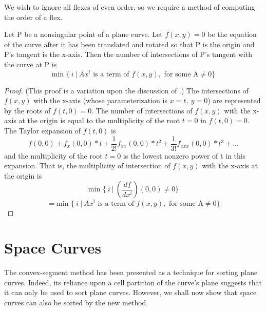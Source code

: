 We wish to ignore all flexes of even order, so we require a method of
computing the order of a flex.
\begin{lemma}
\label{formatofneweqn}
Let P be a nonsingular point of a plane curve.
Let $f(x,y)=0$ be the equation
of the curve after it has been translated and rotated so that P is the
origin and P's tangent is the x-axis.
Then the number of intersections of P's tangent with the curve at P is
\[ \mbox{min } \{\ i\ |\ Ax^{i} \mbox{ is a term of } f(x,y), 
\mbox{ for some A} \neq 0\}\]
\end{lemma}
%
\begin{proof}
(This proof is a variation upon the discussion of \cite[p.\ 53]{wa}.)
The intersections of $f(x,y)$ with the x-axis 
(whose parameterization is \mbox{$x=t,\ y=0$})
are represented by the roots of $f(t,0)=0$.
The number of intersections of $f(x,y)$ with the x-axis at the origin is
equal to the multiplicity of the root $t=0$ in $f(t,0)=0$.
The Taylor expansion of $f(t,0)$ is 
\[ f(0,0) + f_{x}(0,0)*t + \frac{1}{2!}f_{xx}(0,0)*t^{2} +
   \frac{1}{3!}f_{xxx}(0,0)*t^{3} + \ldots \]
and the multiplicity of the root $t=0$ is the lowest nonzero power of t
in this expansion.
That is, the multiplicity of intersection of $f(x,y)$ with the x-axis at
the origin is 
\[ \mbox{min } \{\ i\ |\ (\frac{df}{dx^{i}})(0,0) \neq 0 \} \]
\[ = \mbox{min } \{\ i\ |\ Ax^{i} \mbox{ is a term of } f(x,y), 
\mbox{ for some A} \neq 0\}\]
\end{proof}
%
\section{Space Curves}
\label{sec-spacecurve}

The convex-segment 
method has been presented as a technique for sorting plane curves.
Indeed, its reliance upon a cell partition of the curve's plane suggests that
it can only be used to sort plane curves.
However, we shall now show that space curves can also be sorted by the new 
method.

